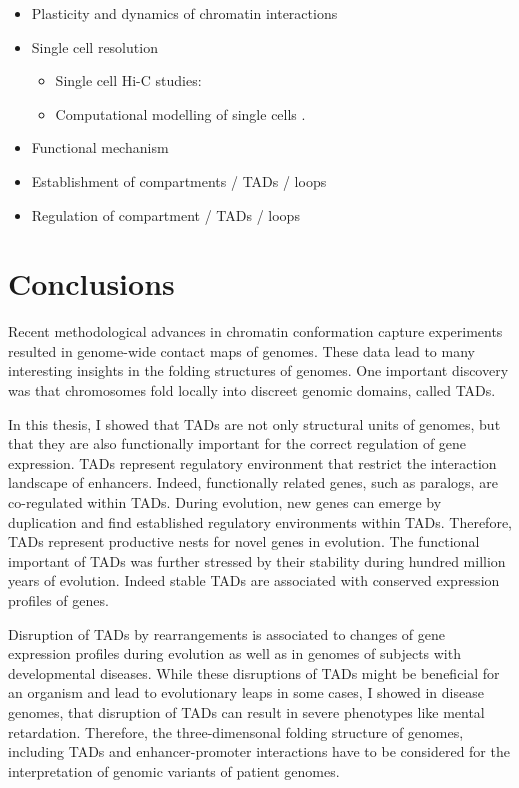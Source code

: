 \documentclass[a4paper,twoside=true,openright,parskip=full,chapterprefix=true,11pt,headings=normal,bibliography=totoc,listof=totoc,titlepage=on,captions=tableabove,draft=false]{scrreprt}
\providecommand{\tightlist}{%
  \setlength{\itemsep}{0pt}\setlength{\parskip}{0pt}}
\theoremstyle{definition}
\theoremstyle{definition}
\theoremstyle{definition}
\theoremstyle{remark}
\begin{document}
\begin{itemize}
\tightlist
\item
  Plasticity and dynamics of chromatin interactions
\item
  Single cell resolution

  \begin{itemize}
  \tightlist
  \item
    Single cell Hi-C studies: \citep{Nagano2017, Stevens2017}
  \item
    Computational modelling of single cells \citep{Sekelja2016}.
  \end{itemize}
\item
  Functional mechanism
\item
  Establishment of compartments / TADs / loops
\item
  Regulation of compartment / TADs / loops
\end{itemize}

\section{Conclusions}\label{conclusions}

Recent methodological advances in chromatin conformation capture
experiments resulted in genome-wide contact maps of genomes. These data
lead to many interesting insights in the folding structures of genomes.
One important discovery was that chromosomes fold locally into discreet
genomic domains, called TADs.

In this thesis, I showed that TADs are not only structural units of
genomes, but that they are also functionally important for the correct
regulation of gene expression. TADs represent regulatory environment
that restrict the interaction landscape of enhancers. Indeed,
functionally related genes, such as paralogs, are co-regulated within
TADs. During evolution, new genes can emerge by duplication and find
established regulatory environments within TADs. Therefore, TADs
represent productive nests for novel genes in evolution. The functional
important of TADs was further stressed by their stability during hundred
million years of evolution. Indeed stable TADs are associated with
conserved expression profiles of genes.

Disruption of TADs by rearrangements is associated to changes of gene
expression profiles during evolution as well as in genomes of subjects
with developmental diseases. While these disruptions of TADs might be
beneficial for an organism and lead to evolutionary leaps in some cases,
I showed in disease genomes, that disruption of TADs can result in
severe phenotypes like mental retardation. Therefore, the
three-dimensonal folding structure of genomes, including TADs and
enhancer-promoter interactions have to be considered for the
interpretation of genomic variants of patient genomes.
\end{document}
